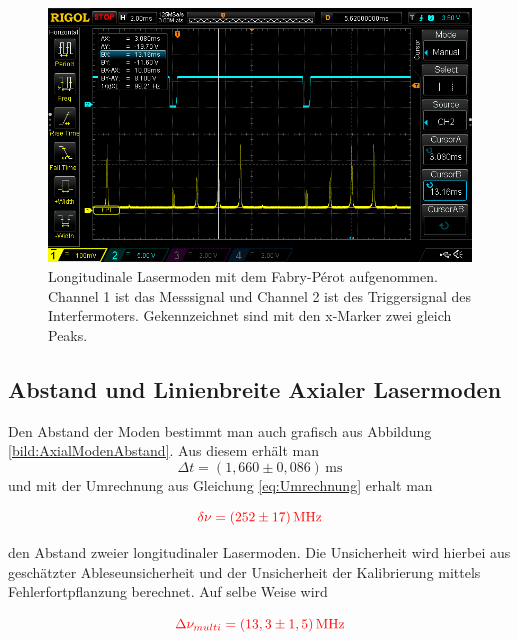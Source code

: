 \begin{figure}[ht]
    \centering
    \includegraphics[width = \linewidth]{Bilder/Auswertung/FabryPerotKalibr.png}
    \caption{Longitudinale Lasermoden mit dem Fabry-Pérot aufgenommen. Channel 1 ist das Messsignal und Channel 2 ist des Triggersignal des Interfermoters. Gekennzeichnet sind 
    mit den x-Marker zwei gleich Peaks.}
    \label{bild:FreierSpektralbereich}
\end{figure}


\subsection*{Abstand und Linienbreite Axialer Lasermoden}

Den Abstand der Moden bestimmt man auch grafisch aus Abbildung \ref{bild:AxialModenAbstand}. Aus diesem erhält man 
\begin{equation*}
    \Delta t = (1,660 \pm 0,086)\,\mathrm{ms}
\end{equation*}
und mit der Umrechnung aus Gleichung \ref{eq:Umrechnung} erhalt man 

\begin{equation}
    \textcolor{red}{\delta \nu = (252 \pm 17)\,\mathrm{MHz}}
    \label{eq:Modenabstand}
\end{equation}

den Abstand zweier longitudinaler Lasermoden. Die Unsicherheit wird hierbei aus geschätzter Ableseunsicherheit und
der Unsicherheit der Kalibrierung mittels Fehlerfortpflanzung berechnet. Auf selbe Weise wird 

\begin{equation}
    \textcolor{red}{\Delta \nu_{multi} = (13,3 \pm 1,5)\,\mathrm{MHz}}
\end{equation}

